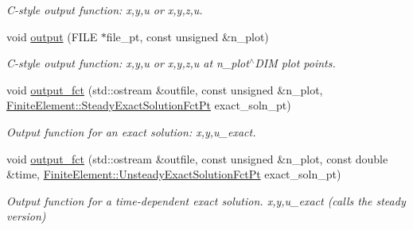 \begin{DoxyCompactItemize}
\begin{DoxyCompactList}\small\item\em C-\/style output function\+: x,y,u or x,y,z,u. \end{DoxyCompactList}\item 
void \hyperlink{classoomph_1_1TPMLHelmholtzElement_afd6b59e8e8c67ab656038b46ea573900}{output} (F\+I\+LE $\ast$file\+\_\+pt, const unsigned \&n\+\_\+plot)
\begin{DoxyCompactList}\small\item\em C-\/style output function\+: x,y,u or x,y,z,u at n\+\_\+plot$^\wedge$\+D\+IM plot points. \end{DoxyCompactList}\item 
void \hyperlink{classoomph_1_1TPMLHelmholtzElement_ad16e9353adb16154f2518ba37269d402}{output\+\_\+fct} (std\+::ostream \&outfile, const unsigned \&n\+\_\+plot, \hyperlink{classoomph_1_1FiniteElement_a690fd33af26cc3e84f39bba6d5a85202}{Finite\+Element\+::\+Steady\+Exact\+Solution\+Fct\+Pt} exact\+\_\+soln\+\_\+pt)
\begin{DoxyCompactList}\small\item\em Output function for an exact solution\+: x,y,u\+\_\+exact. \end{DoxyCompactList}\item 
void \hyperlink{classoomph_1_1TPMLHelmholtzElement_a6484704096ebd1938d584c8059f9ba7d}{output\+\_\+fct} (std\+::ostream \&outfile, const unsigned \&n\+\_\+plot, const double \&time, \hyperlink{classoomph_1_1FiniteElement_ad4ecf2b61b158a4b4d351a60d23c633e}{Finite\+Element\+::\+Unsteady\+Exact\+Solution\+Fct\+Pt} exact\+\_\+soln\+\_\+pt)
\begin{DoxyCompactList}\small\item\em Output function for a time-\/dependent exact solution. x,y,u\+\_\+exact (calls the steady version) \end{DoxyCompactList}\end{DoxyCompactItemize}

